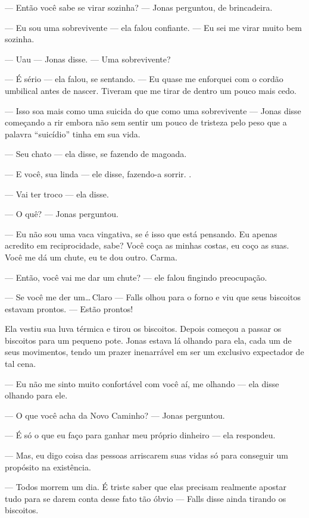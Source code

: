 --- Então você sabe se virar sozinha? --- Jonas perguntou, de brincadeira.

--- Eu sou uma sobrevivente --- ela falou\mudanca{,} confiante. ---  Eu sei me virar muito bem sozinha.

--- Uau --- Jonas disse. --- Uma sobrevivente?

--- É sério --- ela falou, se sentando. --- Eu quase me enforquei com o cordão umbilical antes de nascer. Tiveram que me tirar de dentro um pouco mais cedo.

--- Isso soa mais como uma suicida do que como uma sobrevivente --- Jonas disse\mudanca{,} começando a rir\mudanca{,} embora não sem sentir um pouco de tristeza pelo peso que a palavra ``suicídio'' tinha em sua vida.

--- Seu chato --- ela disse, se fazendo de magoada.

--- E você, sua linda --- ele disse, fazendo-a sorrir. .

--- Vai ter troco --- ela disse.

--- O quê? --- Jonas perguntou.

--- Eu não sou uma vaca vingativa, se é isso que está pensando. Eu apenas acredito em reciprocidade, sabe? Você coça as minhas costas, eu coço as suas. Você me dá um chute, eu te dou outro. Carma.

--- Então, você vai me dar um chute? --- ele falou\mudanca{,} fingindo preocupação.

--- Se você me der um\ldots\,Claro --- Falls olhou para o forno e viu que seus biscoitos estavam prontos. --- Estão prontos!

Ela vestiu sua luva térmica e tirou os biscoitos. Depois começou a passar os biscoitos para um pequeno pote. Jonas estava lá olhando para ela, cada um de seus movimentos, tendo um prazer inenarrável em ser um exclusivo expectador de tal cena.

--- Eu não me sinto muito confortável com você aí, me olhando --- ela disse\mudanca{,} olhando para ele.

--- O que você acha da Novo Caminho? --- Jonas perguntou.

--- É só o que eu faço para ganhar meu próprio dinheiro --- ela respondeu.

--- Mas, eu digo coisa das pessoas arriscarem suas vidas só para conseguir um propósito na existência.

--- Todos morrem um dia. É triste saber que elas precisam realmente apostar tudo para se darem conta desse fato tão óbvio --- Falls disse\mudanca{,} ainda tirando os biscoitos.

